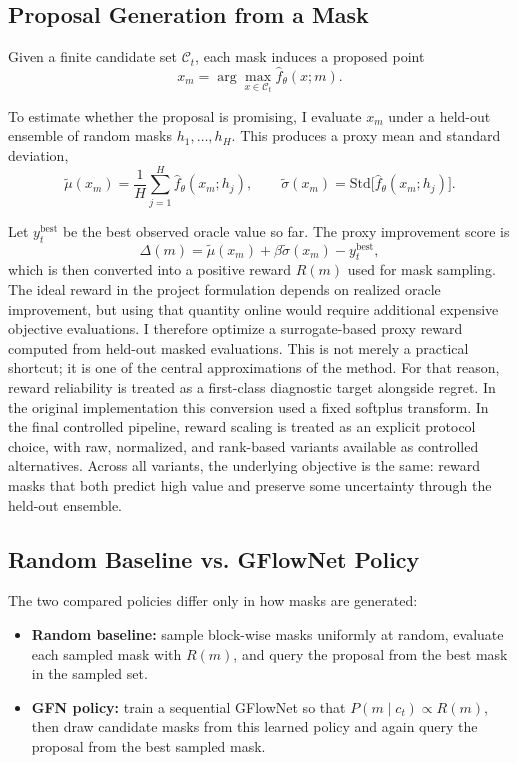 \documentclass{article}
\begin{document}
\subsection{Proposal Generation from a Mask}

Given a finite candidate set $\mathcal{C}_t$, each mask induces a proposed point
\[
x_m = \arg\max_{x \in \mathcal{C}_t} \hat f_\theta(x; m).
\]

To estimate whether the proposal is promising, I evaluate $x_m$ under a held-out ensemble of random masks $h_1,\dots,h_H$. This produces a proxy mean and standard deviation,
\[
\tilde\mu(x_m) = \frac{1}{H}\sum_{j=1}^H \hat f_\theta(x_m; h_j),
\qquad
\tilde\sigma(x_m) = \mathrm{Std}\big[\hat f_\theta(x_m; h_j)\big].
\]

Let $y_t^{\mathrm{best}}$ be the best observed oracle value so far. The proxy improvement score is
\[
\Delta(m) = \tilde\mu(x_m) + \beta \tilde\sigma(x_m) - y_t^{\mathrm{best}},
\]
which is then converted into a positive reward $R(m)$ used for mask sampling. The ideal reward in the project formulation depends on realized oracle improvement, but using that quantity online would require additional expensive objective evaluations. I therefore optimize a surrogate-based proxy reward computed from held-out masked evaluations. This is not merely a practical shortcut; it is one of the central approximations of the method. For that reason, reward reliability is treated as a first-class diagnostic target alongside regret. In the original implementation this conversion used a fixed softplus transform. In the final controlled pipeline, reward scaling is treated as an explicit protocol choice, with raw, normalized, and rank-based variants available as controlled alternatives. Across all variants, the underlying objective is the same: reward masks that both predict high value and preserve some uncertainty through the held-out ensemble.

\subsection{Random Baseline vs. GFlowNet Policy}

The two compared policies differ only in how masks are generated:

\begin{itemize}
    \item \textbf{Random baseline:} sample block-wise masks uniformly at random, evaluate each sampled mask with $R(m)$, and query the proposal from the best mask in the sampled set.
    \item \textbf{GFN policy:} train a sequential GFlowNet so that $P(m \mid c_t) \propto R(m)$, then draw candidate masks from this learned policy and again query the proposal from the best sampled mask.
\end{itemize}
\end{document}
